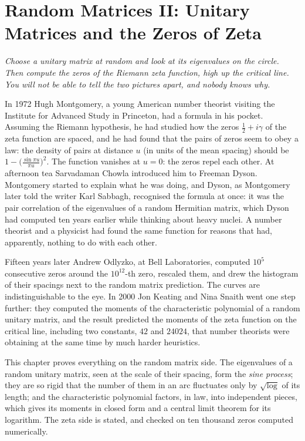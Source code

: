 \chapter{Random Matrices II: Unitary Matrices and the Zeros of Zeta}\label{ch:cue}

\begin{center}\itshape
Choose a unitary matrix at random and look at its eigenvalues on the circle.\\
Then compute the zeros of the Riemann zeta function, high up the critical line.\\
You will not be able to tell the two pictures apart, and nobody knows why.
\end{center}

In 1972 Hugh Montgomery, a young American number theorist visiting the Institute for Advanced Study in Princeton, had a formula in his pocket. Assuming the Riemann hypothesis, he had studied how the
zeros $\frac12+i\gamma$ of the zeta function are spaced, and he had found that the pairs of zeros seem to obey a law: the density of pairs at distance $u$ (in units of the mean spacing) should be $1-\bigl(\frac{\sin\pi u}{\pi u}\bigr)^2$.
The function vanishes at $u=0$: the zeros repel each other. At afternoon tea Sarvadaman Chowla introduced him to Freeman Dyson. Montgomery started to explain what he was doing, and Dyson, as Montgomery later told the
writer Karl Sabbagh, recognised the formula at once: it was the pair correlation of the eigenvalues of a random Hermitian matrix, which Dyson had computed ten years earlier while thinking about heavy nuclei.
A number theorist and a physicist had found the same function for reasons that had, apparently, nothing to do with each other.

Fifteen years later Andrew Odlyzko, at Bell Laboratories, computed $10^5$ consecutive zeros around the $10^{12}$-th zero, rescaled them, and drew the histogram of their spacings next to the random matrix prediction. The curves are
indistinguishable to the eye. In 2000 Jon Keating and Nina Snaith went one step further: they computed the moments of the characteristic polynomial of a random unitary matrix, and the result predicted the moments of the
zeta function on the critical line, including two constants, $42$ and $24024$, that number theorists were obtaining at the same time by much harder heuristics.

This chapter proves everything on the random matrix side. The eigenvalues of a random unitary matrix, seen at the scale of their spacing, form the \emph{sine process}; they are so rigid that the number of them in an arc
fluctuates only by $\sqrt{\log}$ of its length; and the characteristic polynomial factors, in law, into independent pieces, which gives its moments in closed form and a central limit theorem for its logarithm. The zeta side is
stated, and checked on ten thousand zeros computed numerically.

